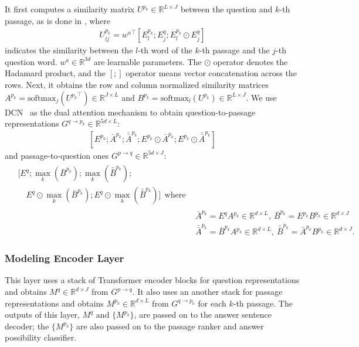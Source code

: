 \documentclass[11pt,a4paper]{article}
\theoremstyle{mydef}
\theoremstyle{myprob}
\begin{document}
It first computes a similarity matrix $U^{p_k} \in \mathbb{R}^{L{\times}J}$ between the question and $k$-th passage, as is done in \citep{SeoKFH17}, where
\begin{align}
U^{p_k}_{lj} = {w^a}^\top [ E^{p_k}_l; E^q_j; E^{p_k}_l \odot E^q_j ]
\end{align}
indicates the similarity between the $l$-th word of the $k$-th passage and the $j$-th question word. $w^a \in \mathbb{R}^{3d}$ are learnable parameters. The $\odot$ operator denotes the Hadamard product, and the $[;]$ operator means vector concatenation across the rows. Next, it obtains the row and column normalized similarity matrices $A^{p_k} = \mathrm{softmax}_j({U^{p_k}}^\top) \in \mathbb{R}^{J\times L}$ and $B^{p_k}  = \mathrm{softmax}_{l}(U^{p_k}) \in \mathbb{R}^{L \times J}$. We use DCN~\citep{XiongZS17} as the dual attention mechanism to obtain question-to-passage representations $G^{q \rightarrow p_k} \in \mathbb{R}^{5d \times L}$:
\begin{align}
\nonumber
[E^{p_k}; \bar{A}^{p_k}; \bar{\bar{A}}^{p_k}; E^{p_k} \odot \bar{A}^{p_k}; E^{p_k} \odot \bar{\bar{A}}^{p_k}] 
\end{align}
and passage-to-question ones
$G^{p \rightarrow q} \in \mathbb{R}^{5d \times J}$:
\begin{align}
\begin{split}
\nonumber
& [ E^{q} ; \max_k(\bar{B}^{p_k}); \max_k(\bar{\bar{B}}^{p_k}); \\
&\hspace{1em} E^{q} \odot \max_k(\bar{B}^{p_k}); E^{q} \odot \max_k(\bar{\bar{B}}^{p_k})  ] \mathrm{\ \ where}
\end{split}\\
\nonumber
&\bar{A}^{p_k} =  E^q A^{p_k}\in \mathbb{R}^{d \times L}, \ 
\bar{B}^{p_k} =  E^{p_k} B^{p_k} \in \mathbb{R}^{d \times J} \\
\nonumber
&\bar{\bar{A}}^{p_k} = \bar{B}^{p_k} A^{p_k} \in \mathbb{R}^{d \times L}, \ 
\bar{\bar{B}}^{p_k} = \bar{A}^{p_k} B^{p_k} \in \mathbb{R}^{d \times J}.
\end{align}

\subsubsection{Modeling Encoder Layer}

This layer uses a stack of Transformer encoder blocks for question representations and obtains $M^q \in \mathbb{R}^{d \times J}$ from $G^{p \rightarrow q}$. It also uses an another stack for passage representations and obtains $M^{p_k} \in \mathbb{R}^{d \times L}$ from $G^{q \rightarrow p_k}$ for each $k$-th passage. The outputs of this layer, $M^q$ and $\{M^{p_k}\}$, are passed on to the answer sentence decoder; the $\{M^{p_k}\}$ are also passed on to the passage ranker and answer possibility classifier.
\end{document}
